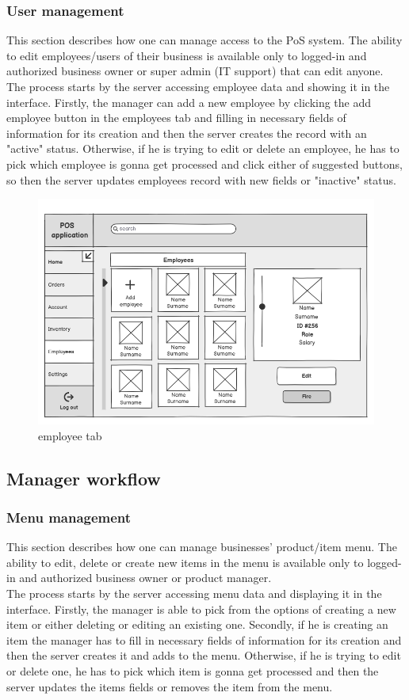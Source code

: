 \documentclass{article}
\begin{document}
    \subsubsection{User management}
    This section describes how one can manage access to the PoS system. The ability to edit employees/users of their business is available only to logged-in and authorized business owner or super admin (IT support) that can edit anyone.\\
    The process starts by the server accessing employee data and showing it in the interface. Firstly, the manager can add a new employee by clicking the add employee button in the employees tab and filling in necessary fields of information for its creation and then the server creates the record with an "active" status. Otherwise, if he is trying to edit or delete an employee, he has to pick which employee is gonna get processed and click either of suggested buttons, so then the server updates employees record with new fields or "inactive" status.
    \begin{figure}[H]
        \centering
        \includegraphics[width=0.9\linewidth]{PSP/lab-1/mockups/employees.png}
        \caption{employee tab}
        \label{}
    \end{figure}
    
    \subsection{Manager workflow}
    \subsubsection{Menu management} %
    This section describes how one can manage businesses' product/item menu. The ability to edit, delete or create new items in the menu is available only to logged-in and authorized business owner or product manager.\\
    The process starts by the server accessing menu data and displaying it in the interface. Firstly, the manager is able to pick from the options of creating a new item or either deleting or editing an existing one. Secondly, if he is creating an item the manager has to fill in necessary fields of information for its creation and then the server creates it and adds to the menu. Otherwise, if he is trying to edit or delete one, he has to pick which item is gonna get processed and then the server updates the items fields or removes the item from the menu.
    
\end{document}
